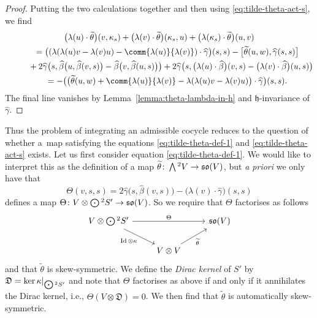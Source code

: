 \documentclass[pdftex]{sigma}
\numberwithin{equation}{section}
\newcommand{\fh}{\mathfrak{h}}
\newcommand{\fso}{\mathfrak{so}}
\newcommand{\fD}{\mathfrak{D}}
\newcommand{\betahat}{\widehat{\beta}}
\newcommand{\gammahat}{\widehat{\gamma}}
\newcommand{\thetatilde}{\widetilde{\theta}}
\newcommand{\Wedge}{\mathchoice{{\textstyle\bigwedge}}{\bigwedge}{\bigwedge}{\bigwedge}}	%
\newcommand{\Odot}{\mathchoice{{\textstyle\bigodot}}{\bigodot}{\bigodot}{\bigodot}}
\newcommand{\1}{\mathbbm{1}}
\DeclareMathOperator{\Id}{Id}
\begin{document}
\begin{proof}
	Putting the two calculations together and then using \eqref{eq:tilde-theta-act-s}, we find
	\begin{gather*}%
		\bigl(\lambda(u)\cdot\thetatilde\bigr)(v,\kappa_s) + \bigl(\lambda(v)\cdot\thetatilde\bigr)(\kappa_s,u) + \bigl(\lambda(\kappa_s)\cdot\thetatilde\bigr)(u,v)\\
		\qquad = \bigl((\lambda(\lambda(u)v-\lambda(v)u) - \comm{\lambda(u)}{\lambda(v)})\cdot\gammahat\bigr)(s,s)
		-\big[\thetatilde(u,w),\gammahat(s,s)\big] \\
		\phantom{\qquad =}{} + 2\gammahat\bigl(s,\betahat\bigl(u,\betahat(v,s)\bigr)-\betahat\bigl(v,\betahat(u,s)\bigr)\bigr)+ 2\gammahat\bigl(s,\bigl(\lambda(u)\cdot\betahat\bigr)(v,s) - \bigl(\lambda(v)\cdot\betahat\bigr)(u,s)\bigr)\\
		\qquad= -\bigl(\bigl(\thetatilde(u,w) + \comm{\lambda(u)}{\lambda(v)} - \lambda(\lambda(u)v-\lambda(v)u)\bigr)\cdot\gammahat\bigr)(s,s).
	\end{gather*}
	The final line vanishes by Lemma~\ref{lemma:theta-lambda-in-h} and $\fh$-invariance of $\gammahat$.
\end{proof}

Thus the problem of integrating an admissible cocycle reduces to the question of whether a~map satisfying the equations \eqref{eq:tilde-theta-def-1} and \eqref{eq:tilde-theta-act-s} exists. Let us first consider equation \eqref{eq:tilde-theta-def-1}. We would like to interpret this as the definition of a map $\thetatilde\colon \Wedge^2V\to \fso(V)$, but \textit{a priori} we only have that
\begin{equation}\label{eq:Theta-def}
	\Theta(v,s,s) = 2\gammahat\bigl(s,\betahat(v,s)\bigr) - \bigl(\lambda(v)\cdot\gammahat\bigr)(s,s)
\end{equation}
defines a map $\Theta\colon V\otimes \Odot^2 S' \to \fso(V)$. So we require  that $\Theta$ factorises as follows
\[%
\begin{tikzcd}
	V\otimes \Odot^2 S' \ar[rr,"\Theta"]\ar[rd,"\Id\otimes \kappa"'] & & \fso(V)\\
		& V \otimes V \ar[ru,"\thetatilde"'] &
\end{tikzcd}
\]
and that $\thetatilde$ is skew-symmetric. We define the \emph{Dirac kernel} of $S'$ by $\fD=\ker\kappa|_{\Odot^2S'}$ and note that $\Theta$ factorises as above if and only if it annihilates the Dirac kernel, i.e., $\Theta(V\otimes\fD)=0$. We then find that $\thetatilde$ is automatically skew-symmetric.
\end{document}
